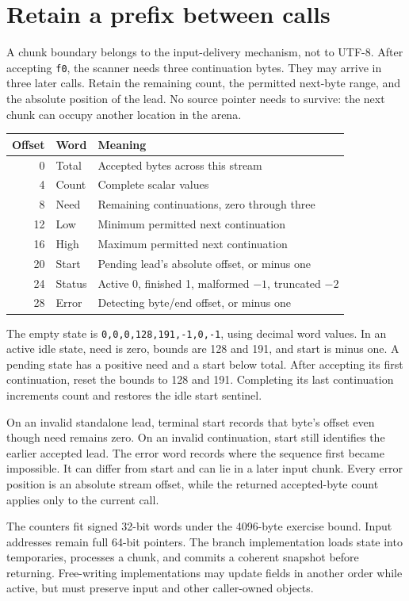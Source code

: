 \section{Retain a prefix between calls}
A chunk boundary belongs to the input-delivery mechanism, not to UTF-8. After
accepting \texttt{f0}, the scanner needs three continuation bytes. They may arrive
in three later calls. Retain the remaining count, the permitted next-byte range,
and the absolute position of the lead. No source pointer needs to survive: the
next chunk can occupy another location in the arena.

\begin{longtable}{rll}
  \toprule Offset & Word   & Meaning                                                  \\\midrule
  0               & Total  & Accepted bytes across this stream                        \\
  4               & Count  & Complete scalar values                                   \\
  8               & Need   & Remaining continuations, zero through three              \\
  12              & Low    & Minimum permitted next continuation                      \\
  16              & High   & Maximum permitted next continuation                      \\
  20              & Start  & Pending lead's absolute offset, or minus one             \\
  24              & Status & Active 0, finished 1, malformed \(-1\), truncated \(-2\) \\
  28              & Error  & Detecting byte/end offset, or minus one                  \\\bottomrule
\end{longtable}
The empty state is \texttt{0,0,0,128,191,-1,0,-1}, using decimal word values.
In an active idle state, need is zero, bounds are 128 and 191, and start is minus
one. A pending state has a positive need and a start below total. After accepting
its first continuation, reset the bounds to 128 and 191. Completing its last
continuation increments count and restores the idle start sentinel.

On an invalid standalone lead, terminal start records that byte's offset even
though need remains zero. On an invalid continuation, start still identifies the
earlier accepted lead. The error word records where the sequence first became
impossible. It can differ from start and can lie in a later input chunk. Every
error position is an absolute stream offset, while the returned accepted-byte
count applies only to the current call.

The counters fit signed 32-bit words under the 4096-byte exercise bound. Input
addresses remain full 64-bit pointers. The branch implementation loads state into
temporaries, processes a chunk, and commits a coherent snapshot before returning.
Free-writing implementations may update fields in another order while active, but
must preserve input and other caller-owned objects.
